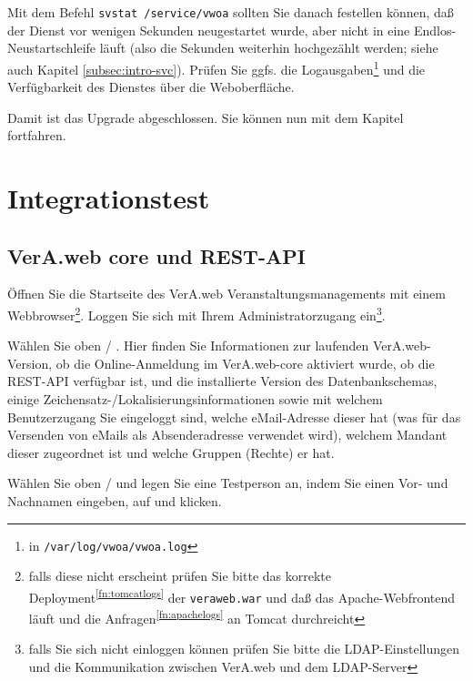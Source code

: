 Mit dem Befehl \texttt{svstat /service/vwoa} sollten Sie
danach festellen können, daß der Dienst vor wenigen Sekunden
neugestartet wurde, aber nicht in eine Endlos-Neustartschleife
läuft (also die Sekunden weiterhin hochgezählt werden; siehe
auch Kapitel \ref{subsec:intro-svc}). Prüfen Sie ggfs. die
Logausgaben\Hair\footnote{\label{fn:vwoalogs}in
\texttt{/var/log/vwoa/vwoa.log}} und die Verfügbarkeit des
Dienstes über die Weboberfläche.

\fi%

Damit ist das Upgrade abgeschlossen.
Sie können nun mit dem Kapitel  fortfahren.

\section{Integrationstest}\label{sec:test}

\ifoa
\subsection{VerA.web core und REST-API}
\fi%

Öffnen Sie die Startseite des VerA.web Veranstaltungsmanagements mit
einem Webbrowser\Hair\footnote{falls diese nicht erscheint prüfen Sie
bitte das korrekte Deployment\Hair\textsuperscript{\ref{fn:tomcatlogs}}
der \texttt{veraweb.war} und daß das Apache-Webfrontend läuft und die
Anfragen\Hair\textsuperscript{\ref{fn:apachelogs}} an Tomcat durchreicht}.
Loggen Sie sich mit Ihrem Administratorzugang ein\Hair\footnote{falls
Sie sich nicht einloggen können prüfen Sie bitte die LDAP-Einstellungen
und die Kommunikation zwischen VerA.web und dem LDAP-Server}.

%

Wählen Sie oben  / . Hier
finden Sie Informationen zur laufenden VerA.web-Version,
\ifoa
ob die Online-Anmeldung im VerA.web-core aktiviert wurde,
\fi%
ob die REST-API verfügbar ist, und die installierte Version des
Datenbankschemas, einige Zeichensatz-/Lokalisierungsinformationen sowie
mit welchem Benutzerzugang Sie eingeloggt sind, welche eMail-Adresse
dieser hat (was für das Versenden von eMails als Absenderadresse
verwendet wird), welchem Mandant dieser zugeordnet ist und welche
Gruppen (Rechte) er hat.

Wählen Sie oben  / 
und legen Sie eine Testperson an, indem Sie einen Vor- und Nachnamen
eingeben, auf  und
 klicken.

